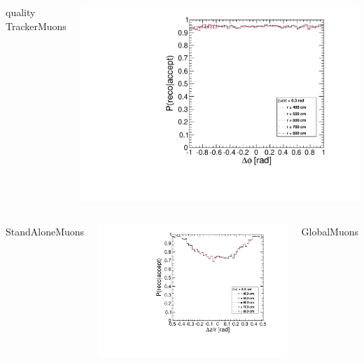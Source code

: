 \documentclass[compress]{beamer}
\begin{document}
\begin{frame}
\begin{columns}
\centering quality TrackerMuons

\includegraphics[width=\linewidth]{barrel_dphi_TrackerMuon.pdf}
\end{columns}

\begin{columns}
\centering StandAloneMuons

\includegraphics[width=\linewidth]{barrel_dz_StandAloneMuon.pdf}

\centering GlobalMuons


\end{columns}
\end{frame}
\end{document}
